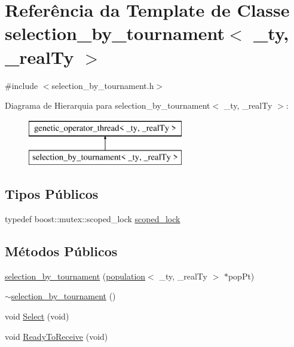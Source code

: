 \hypertarget{classselection__by__tournament}{
\section{Referência da Template de Classe selection\_\-by\_\-tournament$<$ \_\-ty, \_\-realTy $>$}
\label{classselection__by__tournament}
}


{\ttfamily \#include $<$selection\_\-by\_\-tournament.h$>$}

Diagrama de Hierarquia para selection\_\-by\_\-tournament$<$ \_\-ty, \_\-realTy $>$:\begin{figure}[H]
\begin{center}
\leavevmode
\includegraphics[height=2cm]{classselection__by__tournament}
\end{center}
\end{figure}
\subsection*{Tipos Públicos}
\begin{DoxyCompactItemize}
\item 
typedef boost::mutex::scoped\_\-lock \hyperlink{classselection__by__tournament_a0ba2a47db6a59696b51f19341719c3fd}{scoped\_\-lock}
\end{DoxyCompactItemize}
\subsection*{Métodos Públicos}
\begin{DoxyCompactItemize}
\item 
\hyperlink{classselection__by__tournament_a511f69a870e3bb1fdcf7aa8d48383c15}{selection\_\-by\_\-tournament} (\hyperlink{classpopulation}{population}$<$ \_\-ty, \_\-realTy $>$ $\ast$popPt)
\item 
\hyperlink{classselection__by__tournament_a4865e086f5a9f3aeb6991814f13f7eda}{$\sim$selection\_\-by\_\-tournament} ()
\item 
void \hyperlink{classselection__by__tournament_aa2a32fdcbd6365eea3e40a565c9cff3a}{Select} (void)
\item 
void \hyperlink{classselection__by__tournament_a3e16cf77dd481a3ce1a01ac4edffa4ba}{ReadyToReceive} (void)
\end{DoxyCompactItemize}
